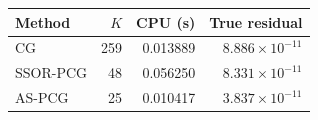 \begin{tabular}{lrrr}
\toprule
Method & $K$ & CPU (s) & True residual \\
\midrule
CG & 259 & 0.013889 & $8.886\times10^{-11}$ \\
SSOR-PCG & 48 & 0.056250 & $8.331\times10^{-11}$ \\
AS-PCG & 25 & 0.010417 & $3.837\times10^{-11}$ \\
\bottomrule
\end{tabular}

